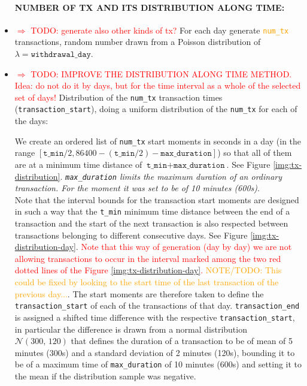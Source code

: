 \documentclass{article}
\begin{document}
\begin{itemize}
    \paragraph{NUMBER OF TX AND ITS DISTRIBUTION ALONG TIME:\\}
    \item \textcolor{red}{$\Rightarrow$ TODO: generate also other kinds of tx?} For each day generate \textcolor{orange}{\texttt{num\_tx}} transactions, random 
    number drawn from a Poisson distribution of $\lambda = \texttt{withdrawal\_day}$.

    \item \textcolor{red}{$\Rightarrow$ TODO: IMPROVE THE DISTRIBUTION ALONG TIME METHOD.
    Idea: do not do it by days, but for the time interval as a whole of the selected set of days!
    }Distribution of the \texttt{num\_tx} transaction times 
    (\texttt{transaction\_start}), doing a uniform distribution of the \texttt{num\_tx}
    for each of the days: 
    
    We create an ordered list of  \texttt{num\_tx} start moments in seconds in a day 
    (in the range $[\texttt{t\_min}/2, 86400-(\texttt{t\_min}/2)-\texttt{max\_duration}]$) so that all of them are at a minimum time distance of $\texttt{t\_min} + \texttt{max\_duration}$. See Figure \ref{img:tx-distribution}.
    \textit{\texttt{max\_duration} limits the maximum duration of an ordinary transaction. 
    For the moment it was set to be of 10 minutes (600s)}.\\
    Note that the interval bounds for the transaction start moments are designed in such 
    a way that the \texttt{t\_min} minimum time distance between the end of a transaction 
    and the start of the next transaction is also respected between transactions belonging 
    to different consecutive days. See Figure \ref{img:tx-distribution-day}. 
    \textcolor{red}{Note that this way of generation (day by day) we are not allowing 
    transactions to occur in the interval marked among the two red dotted lines of the 
    Figure \ref{img:tx-distribution-day}.} \textcolor{orange}{NOTE/TODO: This could be 
    fixed by looking to the start time of the last transaction of the previous day...}. 
    The start moments are therefore taken to define the \texttt{transaction\_start} of 
    each of the transactions of that day. \texttt{transaction\_end} is assigned a shifted 
    time difference with the respective \texttt{transaction\_start}, in particular the 
    difference is drawn from a normal distribution $\mathcal{N}(300,\,120)$ that defines 
    the duration of a transaction to be of mean of 5 minutes (300s) and a standard 
    deviation of 2 minutes (120s), bounding it to be of a maximum time of 
    \texttt{max\_duration} of 10 minutes (600s) and setting it to the mean if the 
    distribution sample was negative. 


\end{itemize}
\end{document}
